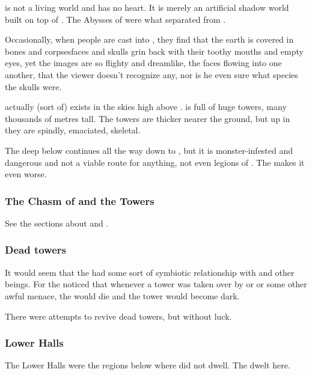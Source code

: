 \Nyx{} is not a living world and has no heart. 
It is merely an artificial shadow world built on top of \Erebos. 
The Abysses of \Ullor were what separated \Nyx from \Erebos. 

Occasionally, when people are cast into \Nyx, they find that the earth is covered in bones and corpses\dash faces and skulls grin back with their toothy mouths and empty eyes, yet the images are so flighty and dreamlike, the faces flowing into one another, that the viewer doesn't recognize any, nor is he even sure what species the skulls were. 

\Nyx{} actually (sort of) exists in the skies high above \Erebos. 
\Erebos{} is full of huge towers, many thousands of metres tall. 
The towers are thicker nearer the ground, but up in \Nyx{} they are spindly, emaciated, skeletal. 

The deep below \Nyx{} continues all the way down to \Erebos, but it is monster-infested and dangerous and not a viable route for anything, not even legions of \banes. 
The \CrystalSphere{} makes it even worse. 





\subsubsection{The Chasm of \Oggra and the \Hyardes Towers}
See the sections about  and . 





\subsubsection{Dead towers}
It would seem that the \glowmoss had some sort of symbiotic relationship with \resphain and other  beings. 
For the \resphain noticed that whenever a tower was taken over by  or  or some other awful menace, the \glowmoss would die and the tower would become dark.

There were attempts to revive dead towers, but without luck. 





\subsubsection{Lower Halls}
The Lower Halls were the regions below where \resphain did not dwell.
The  dwelt here.





